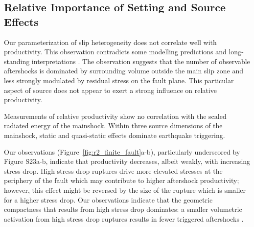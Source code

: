 \documentclass[draft, jgrga]{agujournal2018}
\begin{document}
\subsection{Relative Importance of Setting and Source Effects}

Our parameterization of slip heterogeneity does not correlate well with productivity. This observation contradicts some modelling predictions \citep{Helmstetter2006RelationModel, Marsan2006} and long-standing interpretations \citep[e.g.][]{Mogi1967}. The observation suggests that the number of observable aftershocks is dominated by surrounding volume outside the main slip zone and less strongly modulated by residual stress on the fault plane. This particular aspect of source does not appear to exert a strong influence on relative productivity.
    
Measurements of relative productivity show no correlation with the scaled radiated energy of the mainshock. Within three source dimensions of the mainshock, static and quasi-static effects dominate earthquake triggering. 

Our observations (Figure~\ref{fig:r2_finite_fault}a-b), particularly underscored by Figure S23a-b, indicate that productivity decreases, albeit weakly, with increasing stress drop. High stress drop ruptures drive more elevated stresses at the periphery of the fault which may contribute to higher aftershock productivity; however, this effect might be reversed by the size of the rupture which is smaller for a higher stress drop. Our observations indicate that the geometric compactness that results from high stress drop dominates: a smaller volumetric activation from high stress drop ruptures results in fewer triggered aftershocks \citep{Wetzler2016}.

\end{document}
